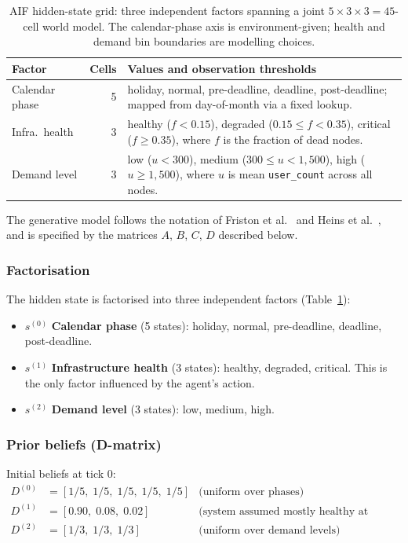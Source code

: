 \documentclass[11pt, a4paper]{article}
\begin{document}
\begin{table}[ht]
\centering
\caption{AIF hidden-state grid: three independent factors spanning a joint
         $5\times3\times3=45$-cell world model.
         The calendar-phase axis is environment-given; health and demand
         bin boundaries are modelling choices.}
\label{tab:state_grid}
\begin{tabular}{@{}lrp{8.5cm}@{}}
\toprule
\textbf{Factor} & \textbf{Cells} & \textbf{Values and observation thresholds} \\
\midrule
Calendar phase  & 5
  & holiday, normal, pre-deadline, deadline, post-deadline;
    mapped from day-of-month via a fixed lookup. \\[4pt]
Infra.\ health  & 3
  & healthy ($f < 0.15$), degraded ($0.15 \le f < 0.35$), critical
    ($f \ge 0.35$), where $f$ is the fraction of dead nodes. \\[4pt]
Demand level    & 3
  & low ($u < 300$), medium ($300 \le u < 1{,}500$), high
    ($u \ge 1{,}500$), where $u$ is mean \texttt{user\_count}
    across all nodes. \\
\bottomrule
\end{tabular}
\end{table}

The generative model follows the notation of Friston et al.~\cite{friston2017}
and Heins et al.~\cite{pymdp}, and is specified by the matrices $A$, $B$, $C$,
$D$ described below.

\subsubsection{Factorisation}
The hidden state is factorised into three independent factors
(Table~\ref{tab:state_grid}):
\begin{itemize}
  \item $s^{(0)}$ \textbf{Calendar phase} (5 states): holiday, normal,
        pre-deadline, deadline, post-deadline.
  \item $s^{(1)}$ \textbf{Infrastructure health} (3 states): healthy,
        degraded, critical.
        This is the only factor influenced by the agent's action.
  \item $s^{(2)}$ \textbf{Demand level} (3 states): low, medium, high.
\end{itemize}

\subsubsection{Prior beliefs (\textbf{D}-matrix)}
Initial beliefs at tick 0:
\begin{align*}
  D^{(0)} &= [1/5,\; 1/5,\; 1/5,\; 1/5,\; 1/5]
           & \text{(uniform over phases)} \\
  D^{(1)} &= [0.90,\; 0.08,\; 0.02]
           & \text{(system assumed mostly healthy at start)} \\
  D^{(2)} &= [1/3,\; 1/3,\; 1/3]
           & \text{(uniform over demand levels)}
\end{align*}
\end{document}
